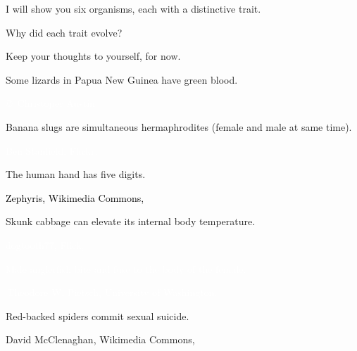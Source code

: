 \documentclass[t]{beamer}
\begin{document}
%
%
\begin{frame}{I will show you six organisms, each with a distinctive trait.}

\hangpara {} Why did each trait evolve?

\hangpara Keep your thoughts to yourself, for now.

\end{frame}
%
{
\begin{frame}[t]{Some lizards in Papua New Guinea have \textcolor{green6}{green} blood.}

\vfilll 

\hfill \textcolor{white}{\tiny \copyright~Christoper Austin}
\end{frame}
}
%
{
\begin{frame}[t]{Banana slugs are simultaneous hermaphrodites (female and male at same time).}

\vfilll 

\hfill \textcolor{white}{\tiny Ben Stanfield, Flickr, }
\end{frame}
}
%
{
\begin{frame}[t]{The human hand has five digits.}

\vfilll 

\hfill \textcolor{black}{\tiny Zephyris, Wikimedia Commons, }
\end{frame}
}
%
{
\begin{frame}[t]{Skunk cabbage can elevate its internal body temperature.}

\vfilll 

\tiny \textcolor{white}{dogtooth77, Flick, }
\end{frame}
}
%
{
\begin{frame}[t]{\textcolor{white}{Male anglerfish bite and fuse to the body of the female.}}

\vfilll 

\hfill\tiny\textcolor{white}{\textcopyright\,Theodore W. Pietsch, University of Washington.}
\end{frame}
}
%
{
\begin{frame}[t]{Red-backed spiders commit sexual suicide.}

\vfilll 

\hfill \tiny David McClenaghan, Wikimedia Commons, 
\end{frame}
}
\end{document}

